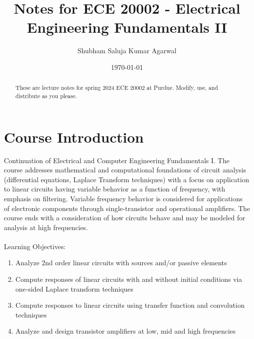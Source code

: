 \documentclass[nobib]{tufte-handout}
\title{Notes for ECE 20002 - Electrical Engineering Fundamentals II}
\author[Shubham Saluja Kumar Agarwal]{Shubham Saluja Kumar Agarwal}
\date{\today}  %
\begin{document}
\maketitle

\begin{abstract}
These are lecture notes for spring 2024 ECE 20002 at Purdue. Modify, use, and distribute as you please.
\end{abstract}

\tableofcontents

\section{Course Introduction}

Continuation of Electrical and Computer Engineering Fundamentals I. The course addresses
mathematical and computational foundations of circuit analysis (differential equations, Laplace Transform techniques) with a focus on application to linear circuits having variable behavior as a function of frequency, with emphasis on filtering. Variable frequency behavior is considered for applications of electronic components through single-transistor and operational amplifiers. The course ends with a consideration of how circuits behave and may be modeled for analysis at high frequencies.\\~\\
Learning Objectives:
\begin{enumerate}
    \item Analyze 2nd order linear circuits with sources and/or passive elements
    \item Compute responses of linear circuits with and without initial conditions via one-sided Laplace transform techniques
    \item Compute responses to linear circuits using transfer function and convolution techniques
    \item Analyze and design transistor amplifiers at low, mid and high frequencies
\end{enumerate}

\pagebreak 
\end{document}
